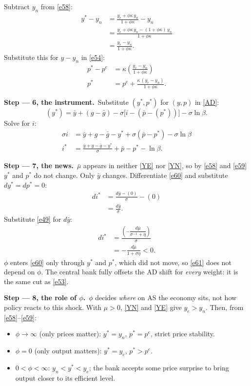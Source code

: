 \documentclass[11pt,a4paper]{article}
\newcommand{\passo}[1]{\par\smallskip\noindent\textbf{Step --- #1.}~}
\begin{document}
Subtract $y_n$ from \eqref{e58}:
\begin{align*}
y^\ast-y_n &= \frac{y_e+\phi\kappa\,y_n}{1+\phi\kappa}-y_n\\
&= \frac{y_e+\phi\kappa\,y_n-(1+\phi\kappa)\,y_n}{1+\phi\kappa}\\
&= \frac{y_e-y_n}{1+\phi\kappa}.
\end{align*}
Substitute this for $y-y_n$ in \eqref{e54}:
\begin{align}
p^\ast-p^e &= \kappa\left(\frac{y_e-y_n}{1+\phi\kappa}\right)\nonumber\\
p^\ast &= p^e+\frac{\kappa\,(y_e-y_n)}{1+\phi\kappa}. \label{e59}
\end{align}
\passo{6, the instrument}Substitute $(y^\ast,p^\ast)$ for $(y,p)$ in \eqref{AD}:
\[
(y^\ast)=\bar y+(g-\bar g)-\sigma\big[i-(\bar p-(p^\ast))\big]-\sigma\ln\beta .
\]
Solve for $i$:
\begin{align}
\sigma i &= \bar y+g-\bar g-y^\ast+\sigma(\bar p-p^\ast)-\sigma\ln\beta\nonumber\\
i^\ast &= \frac{\bar y+g-\bar g-y^\ast}{\sigma}+\bar p-p^\ast-\ln\beta. \label{e60}
\end{align}
\passo{7, the news}$\bar\mu$ appears in neither \eqref{YE} nor \eqref{YN}, so by \eqref{e58} and
\eqref{e59} $y^\ast$ and $p^\ast$ do not change. Only $\bar y$ changes. Differentiate \eqref{e60}
and substitute $dy^\ast=dp^\ast=0$:
\begin{align*}
di^\ast &= \frac{d\bar y-(0)}{\sigma}-(0)\\
&= \frac{d\bar y}{\sigma}.
\end{align*}
Substitute \eqref{e49} for $d\bar y$:
\begin{align}
di^\ast &= \frac{\left(-\dfrac{d\bar\mu}{\sigma^{-1}+\eta}\right)}{\sigma}\nonumber\\
&= -\frac{d\bar\mu}{1+\sigma\eta}<0. \label{e61}
\end{align}
$\phi$ enters \eqref{e60} only through $y^\ast$ and $p^\ast$, which did not move, so \eqref{e61}
does not depend on $\phi$. The central bank fully offsets the AD shift for \emph{every} weight: it is
the same cut as \eqref{e53}.
\passo{8, the role of $\phi$}$\phi$ decides \emph{where} on AS the economy sits, not how policy
reacts to this shock. With $\mu>0$, \eqref{YN} and \eqref{YE} give $y_e>y_n$. Then, from
\eqref{e58}--\eqref{e59}:
\begin{itemize}[leftmargin=1.4em]
\item $\phi\to\infty$ (only prices matter): $y^\ast=y_n$, $p^\ast=p^e$, strict price stability.
\item $\phi=0$ (only output matters): $y^\ast=y_e$, $p^\ast>p^e$.
\item $0<\phi<\infty$: $y_n<y^\ast<y_e$; the bank accepts some price surprise to bring output closer
to its efficient level.
\end{itemize}
\end{document}
